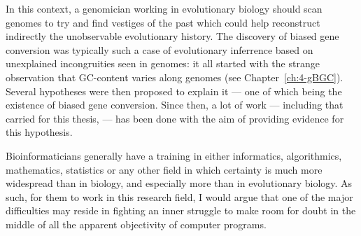 In this context, a genomician working in evolutionary biology should scan genomes to try and find vestiges of the past which could help reconstruct indirectly the unobservable evolutionary history.
The discovery of biased gene conversion was typically such a case of evolutionary inferrence based on unexplained incongruities seen in genomes:
it all started with the strange observation that GC-content varies along genomes (see Chapter~\ref{ch:4-gBGC}).
Several hypotheses were then proposed to explain it — one of which being the existence of biased gene conversion.
Since then, a lot of work — including that carried for this thesis, — has been done with the aim of providing evidence for this hypothesis.

Bioinformaticians generally have a training in either informatics, algorithmics, mathematics, statistics or any other field in which certainty is much more widespread than in biology, and especially more than in evolutionary biology.
As such, for them to work in this research field, I would argue that one of the major difficulties may reside in fighting an inner struggle to make room for doubt in the middle of all the apparent objectivity of computer programs.\\





%


